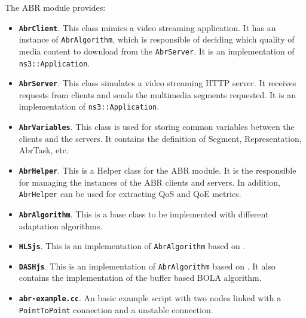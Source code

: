 The ABR module provides:
\begin{itemize}[noitemsep,topsep=0pt]
  \item \texttt{\textbf{AbrClient}}. This class mimics a video streaming application. It has an instance 
  of \texttt{AbrAlgorithm}, which is responsible of 
  deciding which quality of media content to download from the \texttt{AbrServer}.
  It is an implementation of \texttt{ns3::Application}.
  \item \texttt{\textbf{AbrServer}}. This class simulates a video streaming HTTP server. It receives
  requests from clients and sends the multimedia segments requested. It is an implementation of 
  \texttt{ns3::Application}.
  \item \texttt{\textbf{AbrVariables}}. This class is used for storing common variables between the clients
  and the servers. It contains the definition of Segment, Representation, AbrTask, etc.
  \item \texttt{\textbf{AbrHelper}}. This is a Helper class for the ABR module. It is the responsible 
  for managing the instances of the ABR clients and servers. In addition, \texttt{AbrHelper} can be
  used for extracting QoS and QoE metrics.
  \item \texttt{\textbf{AbrAlgorithm}}. This is a base class to be implemented with different 
  adaptation algorithms.
  \item \texttt{\textbf{HLSjs}}. This is an implementation of \texttt{AbrAlgorithm} based on \cite{hls3}.
  \item \texttt{\textbf{DASHjs}}. This is an implementation of \texttt{AbrAlgorithm} based on \cite{dash3}. 
  It also contains the implementation of the buffer based BOLA algorithm.
  \item \texttt{\textbf{abr-example.cc}}. An basic example script with two nodes linked with a
  \texttt{PointToPoint} connection and a unstable connection.
\end{itemize}

